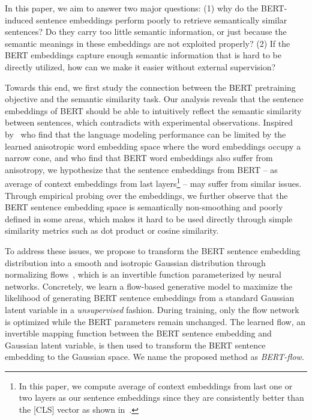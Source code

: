 \documentclass[11pt,a4paper]{article}
\begin{document}
In this paper, we aim to answer two major questions: (1) why do the BERT-induced sentence embeddings perform poorly to retrieve semantically similar sentences? Do they carry too little semantic information, or just because the semantic meanings in these embeddings are not exploited properly? (2) If the BERT embeddings capture enough semantic information that is hard to be directly utilized, how can we make it easier without external supervision?




Towards this end, we first study the connection between the BERT pretraining objective and the semantic similarity task. Our analysis reveals that the sentence embeddings of BERT should be able to intuitively reflect the semantic similarity between sentences, which contradicts with experimental observations. Inspired by~\citet{gao2019representation} who find that the language modeling performance can be limited by the learned anisotropic word embedding space where the word embeddings occupy a narrow cone, and \citet{ethayarajh2019contextual} who find that BERT word embeddings also suffer from anisotropy, we hypothesize that the sentence embeddings from BERT -- as average of context embeddings from last layers\footnote{In this paper, we compute average of context embeddings from last one or two layers as our sentence embeddings since they are consistently better than the [CLS] vector as shown in~\citep{reimers2019sentence}.} -- may suffer from similar issues. 
Through empirical probing over the embeddings, we further observe that the BERT sentence embedding space is semantically non-smoothing and poorly defined in some areas, which makes it hard to be used directly through simple similarity metrics such as dot product or cosine similarity. 













To address these issues, we propose to transform the BERT sentence embedding distribution into a smooth and isotropic Gaussian distribution through normalizing flows~\citep{dinh2014nice}, which is an invertible function parameterized by neural networks. 
Concretely, we learn a flow-based generative model to maximize the likelihood of generating BERT sentence embeddings from a standard Gaussian latent variable in a \emph{unsupervised} fashion. During training, only the flow network is optimized while the BERT parameters remain unchanged. The learned flow, an invertible mapping function between the BERT sentence embedding and Gaussian latent variable, is then used to transform the BERT sentence embedding to the Gaussian space. We name the proposed method as \textit{BERT-flow}.
\end{document}
